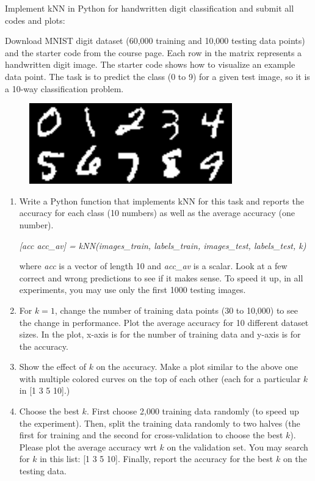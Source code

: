 \documentclass[fleqn]{article}
\begin{document}
Implement kNN in Python for handwritten digit classification and submit all codes and plots:

Download MNIST digit dataset (60,000 training and 10,000 testing data points) and the starter code from the course page. Each row in the matrix represents a handwritten digit image. The starter code shows how to visualize an example data point. The task is to predict the class (0 to 9) for a given test image, so it is a 10-way classification problem.

\begin{figure}[h]
\centering
\includegraphics[width=.4\linewidth]{mnist-dataset.png}
\end{figure}


\begin{enumerate}


\item Write a Python function that implements kNN for this task and reports the accuracy for each class (10 numbers) as well as the average accuracy (one number).

{\em [acc acc\_av] = kNN(images\_train, labels\_train, images\_test, labels\_test, k)}

where {\em acc} is a vector of length 10 and {\em acc\_av} is a scalar. Look at a few correct and wrong predictions to see if it makes sense. To speed it up, in all experiments, you may use only the first 1000 testing images.

\item For $k=1$, change the number of training data points (30 to 10,000) to see the change in performance. Plot the average accuracy for 10 different dataset sizes. In the plot, x-axis is for the number of training data and y-axis is for the accuracy.

\item Show the effect of $k$ on the accuracy. Make a plot similar to the above one with multiple colored curves on the top of each other (each for a particular $k$ in [1 3 5 10].)

\item Choose the best $k$. First choose 2,000 training data randomly (to speed up the experiment). Then, split the training data randomly to two halves (the first for training and the second for cross-validation to choose the best $k$). Please plot the average accuracy wrt $k$ on the validation set. You may search for $k$ in this list: [1 3 5 10]. Finally, report the accuracy for the best $k$ on the testing data.

\end{enumerate}
\end{document}
